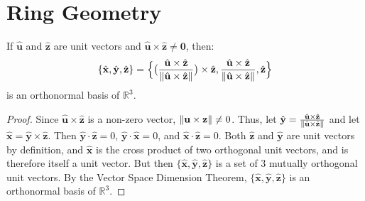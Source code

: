     \section{Ring Geometry}
        \begin{theorem}
            \label{theorem:ring_occ_geom_x_y_z_orthonormal_basis}
            If $\hat{\mathbf{u}}$ and $\hat{\mathbf{z}}$ are unit
            vectors and
            $\hat{\mathbf{u}}\times%
             \hat{\mathbf{z}}\ne\mathbf{0}$,
            then:
            \begin{equation}
                \label{eqn:Cassini_Math_Saturn_Basis}
                \{\hat{\mathbf{x}},\hat{\mathbf{y}},
                \hat{\mathbf{z}}\}
                =\Big\{\big(
                    \frac{\hat{\mathbf{u}}\times\hat{\mathbf{z}}}
                         {\lVert\hat{\mathbf{u}}\times
                          \hat{\mathbf{z}}\rVert}
                \big)\times\hat{\mathbf{z}},
                \frac{\hat{\mathbf{u}}\times\hat{\mathbf{z}}}
                     {\lVert\hat{\mathbf{u}}\times
                      \hat{\mathbf{z}}\rVert},
                \hat{\mathbf{z}}\Big\}
            \end{equation}
            is an orthonormal basis of $\mathbb{R}^{3}$.
        \end{theorem}
        \begin{proof}
            Since $\hat{\mathbf{u}}\times\hat{\mathbf{z}}$ is a
            non-zero vector,
            $\lVert\mathbf{u}\times\mathbf{z}\rVert\ne{0}$. Thus, let
            $\hat{\mathbf{y}}%
             =\frac{\hat{\mathbf{u}}\times\hat{\mathbf{z}}}%
                   {\norm{\hat{\mathbf{u}}\times\hat{\mathbf{z}}}}$
            and let
            $\hat{\mathbf{x}}%
             =\hat{\mathbf{y}}\times\hat{\mathbf{z}}$.
            Then $\hat{\mathbf{y}}\cdot\hat{\mathbf{z}}=0$,
            $\hat{\mathbf{y}}\cdot\hat{\mathbf{x}}=0$,
            and $\hat{\mathbf{x}}\cdot\hat{\mathbf{z}}=0$.
            Both $\hat{\mathbf{z}}$ and $\hat{\mathbf{y}}$ are unit
            vectors by definition, and $\hat{\mathbf{x}}$ is the
            cross product of two orthogonal unit vectors, and is
            therefore itself a unit vector. But then
            $\{\hat{\mathbf{x}},\hat{\mathbf{y}},\hat{\mathbf{z}}\}$
            is a set of 3 mutually orthogonal unit vectors.
            By the Vector Space Dimension Theorem,
            $\{\hat{\mathbf{x}},%
               \hat{\mathbf{y}},%
               \hat{\mathbf{z}}\}$
            is an orthonormal basis of $\mathbb{R}^3$.
        \end{proof}
